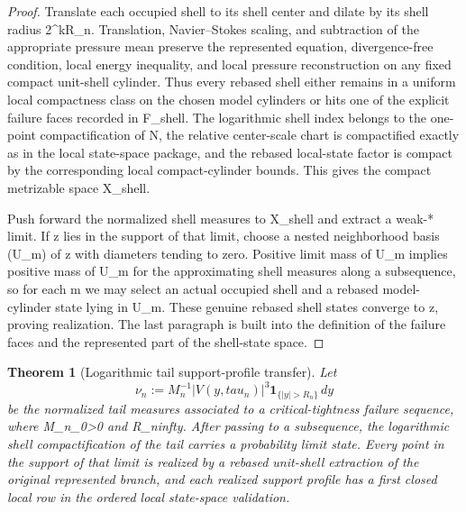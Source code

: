 \documentclass[11pt]{amsart}
\def\({}%
\def\){}%
\def\mathfrak#1{#1}%
\def\mathbb#1{#1}%
\def\tau{tau}%
\def\infty{infty}%
\theoremstyle{plain}
\newtheorem{theorem}{Theorem}[section]
\theoremstyle{definition}
\theoremstyle{remark}
\begin{document}
\begin{proof}
Translate each occupied shell to its shell center and dilate by its shell radius
\(2^kR_n\).  Translation, Navier--Stokes scaling, and subtraction of the
appropriate pressure mean preserve the represented equation, divergence-free
condition, local energy inequality, and local pressure reconstruction on any
fixed compact unit-shell cylinder.  Thus every rebased shell either remains in a
uniform local compactness class on the chosen model cylinders or hits one of the
explicit failure faces recorded in \(\mathfrak F_{\rm shell}\).  The logarithmic
shell index belongs to the one-point compactification of \(\mathbb N\), the
relative center-scale chart is compactified exactly as in the local state-space
package, and the rebased local-state factor is compact by the corresponding
local compact-cylinder bounds.  This gives the compact metrizable space
\(\mathfrak X_{\rm shell}\).

Push forward the normalized shell measures to \(\mathfrak X_{\rm shell}\) and
extract a weak-* limit.  If \(\mathfrak z\) lies in the support of that limit,
choose a nested neighborhood basis \((U_m)\) of \(\mathfrak z\) with diameters
tending to zero.  Positive limit mass of \(U_m\) implies positive mass of
\(U_m\) for the approximating shell measures along a subsequence, so for each
\(m\) we may select an actual occupied shell and a rebased model-cylinder state
lying in \(U_m\).  These genuine rebased shell states converge to
\(\mathfrak z\), proving realization.  The last paragraph is built into the
definition of the failure faces and the represented part of the shell-state
space.
\end{proof}

\begin{theorem}[Logarithmic tail support-profile transfer]
\label{paper9:thm:logarithmic-tail-support-transfer}
Let
\[
  \nu_n
  :=
  M_n^{-1}|V(y,\tau_n)|^3\mathbf 1_{\{|y|>R_n\}}\,dy
\]
be the normalized tail measures associated to a critical-tightness failure
sequence, where \(M_n\ge\varepsilon_0>0\) and \(R_n\to\infty\).  After passing
to a subsequence, the logarithmic shell compactification of the tail carries a
probability limit state.  Every point in the support of that limit is realized
by a rebased unit-shell extraction of the original represented branch, and each
realized support profile has a first closed local row in the ordered local
state-space validation.
\end{theorem}
\end{document}
